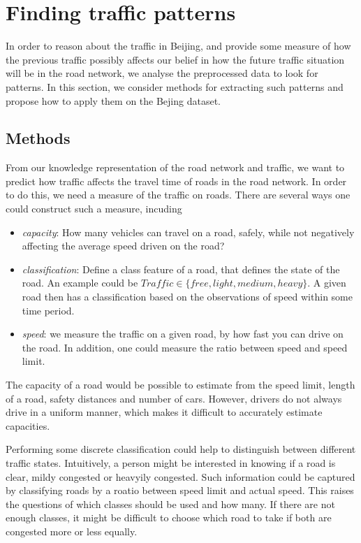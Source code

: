 \section{Finding traffic patterns}\label{traffic-patterns}
In order to reason about the traffic in Beijing, and provide some measure of how the previous traffic possibly affects our belief in how the future traffic situation will be in the road network, we analyse the preprocessed data to look for patterns. In this section, we consider methods for extracting such patterns and propose how to apply them on the Bejing dataset.
\subsection{Methods}\label{patterns:methods}
From our knowledge representation of the road network and traffic, we want to predict how traffic affects the travel time of roads in the road network. In order to do this, we need a measure of the traffic on roads. There are several ways one could construct such a measure, incuding
\begin{itemize}
\item \emph{capacity}: How many vehicles can travel on a road, safely, while not negatively affecting the average speed driven on the road?
\item \emph{classification}: Define a class feature of a road, that defines the state of the road. An example could be $Traffic \in \{free, light, medium, heavy\}$. A given road then has a classification based on the observations of speed within some time period.
\item \emph{speed}: we measure the traffic on a given road, by how fast you can drive on the road. In addition, one could measure the ratio between speed and speed limit.
\end{itemize}
The capacity of a road would be possible to estimate from the speed limit, length of a road, safety distances and number of cars. However, drivers do not always drive in a uniform manner, which makes it difficult to accurately estimate capacities.\par
Performing some discrete classification could help to distinguish between different traffic states. Intuitively, a person might be interested in knowing if a road is clear, mildy congested or heavyily congested. Such information could be captured by classifying roads by a roatio between speed limit and actual speed. This raises the questions of which classes should be used and how many. If there are not enough classes, it might be difficult to choose which road to take if both are congested more or less equally.\par

